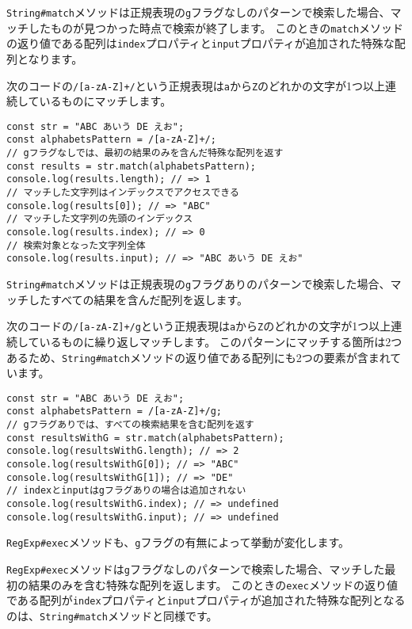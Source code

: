 \texttt{String\#match}メソッドは正規表現の\texttt{g}フラグなしのパターンで検索した場合、マッチしたものが見つかった時点で検索が終了します。
このときの\texttt{match}メソッドの返り値である配列は\texttt{index}プロパティと\texttt{input}プロパティが追加された特殊な配列となります。

次のコードの\texttt{/[a-zA-Z]+/}という正規表現は\texttt{a}から\texttt{Z}のどれかの文字が1つ以上連続しているものにマッチします。

\begin{lstlisting}
const str = "ABC あいう DE えお";
const alphabetsPattern = /[a-zA-Z]+/;
// gフラグなしでは、最初の結果のみを含んだ特殊な配列を返す
const results = str.match(alphabetsPattern);
console.log(results.length); // => 1
// マッチした文字列はインデックスでアクセスできる
console.log(results[0]); // => "ABC"
// マッチした文字列の先頭のインデックス
console.log(results.index); // => 0
// 検索対象となった文字列全体
console.log(results.input); // => "ABC あいう DE えお"
\end{lstlisting}

\texttt{String\#match}メソッドは正規表現の\texttt{g}フラグありのパターンで検索した場合、マッチしたすべての結果を含んだ配列を返します。

次のコードの\texttt{/[a-zA-Z]+/g}という正規表現は\texttt{a}から\texttt{Z}のどれかの文字が1つ以上連続しているものに繰り返しマッチします。
このパターンにマッチする箇所は2つあるため、\texttt{String\#match}メソッドの返り値である配列にも2つの要素が含まれています。

\begin{lstlisting}
const str = "ABC あいう DE えお";
const alphabetsPattern = /[a-zA-Z]+/g;
// gフラグありでは、すべての検索結果を含む配列を返す
const resultsWithG = str.match(alphabetsPattern);
console.log(resultsWithG.length); // => 2
console.log(resultsWithG[0]); // => "ABC"
console.log(resultsWithG[1]); // => "DE"
// indexとinputはgフラグありの場合は追加されない
console.log(resultsWithG.index); // => undefined
console.log(resultsWithG.input); // => undefined
\end{lstlisting}

\texttt{RegExp\#exec}メソッドも、\texttt{g}フラグの有無によって挙動が変化します。

\texttt{RegExp\#exec}メソッドは\texttt{g}フラグなしのパターンで検索した場合、マッチした最初の結果のみを含む特殊な配列を返します。
このときの\texttt{exec}メソッドの返り値である配列が\texttt{index}プロパティと\texttt{input}プロパティが追加された特殊な配列となるのは、\texttt{String\#match}メソッドと同様です。

